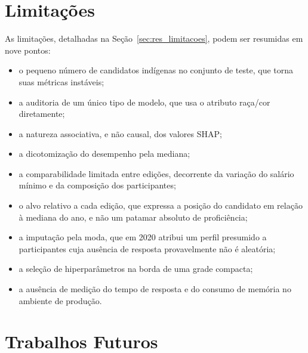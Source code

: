 \section{Limitações}

As limitações, detalhadas na Seção~\ref{sec:res_limitacoes}, podem ser resumidas em nove pontos:
\begin{itemize}
    \item o pequeno número de candidatos indígenas no conjunto de teste, que torna suas métricas instáveis;
    \item a auditoria de um único tipo de modelo, que usa o atributo raça/cor diretamente;
    \item a natureza associativa, e não causal, dos valores SHAP;
    \item a dicotomização do desempenho pela mediana;
    \item a comparabilidade limitada entre edições, decorrente da variação do salário mínimo e da composição dos participantes;
    \item o alvo relativo a cada edição, que expressa a posição do candidato em relação à mediana do ano, e não um patamar absoluto de proficiência;
    \item a imputação pela moda, que em 2020 atribui um perfil presumido a participantes cuja ausência de resposta provavelmente não é aleatória;
    \item a seleção de hiperparâmetros na borda de uma grade compacta;
    \item a ausência de medição do tempo de resposta e do consumo de memória no ambiente de produção.
\end{itemize}

\section{Trabalhos Futuros}

